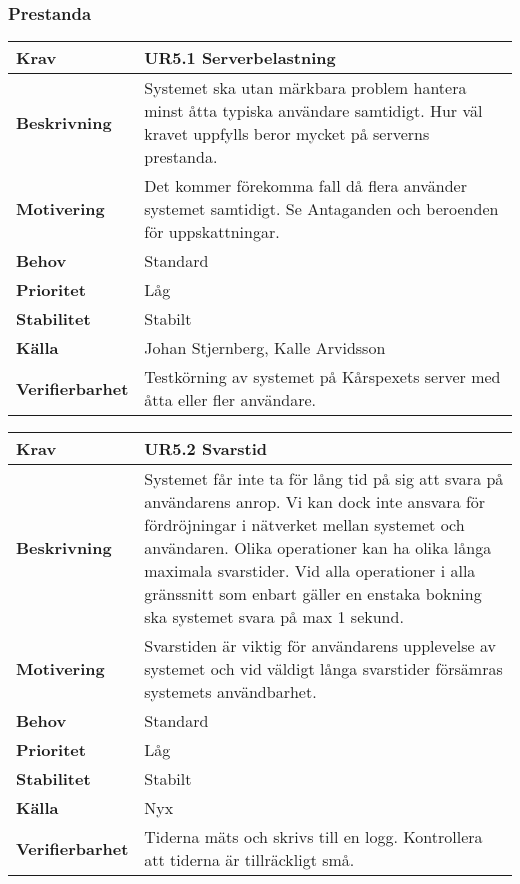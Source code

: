 \documentclass[a4paper, twoside, 11pt, titlepage]{article}
\begin{document}
		\subsubsection{Prestanda}


		\begin{tabular} { p{2.6cm} p{12.5cm} }
			\hline
			\sffamily\textbf{Krav} & \sffamily\textbf{UR5.1 Serverbelastning } \\
			\hline
			\sffamily\textbf{Beskrivning} & Systemet ska utan märkbara problem hantera minst åtta typiska användare samtidigt. Hur väl kravet uppfylls beror mycket på serverns prestanda.  \\
			\hline
			\sffamily\textbf{Motivering} & Det kommer förekomma fall då flera använder systemet samtidigt. Se Antaganden och beroenden för uppskattningar.  \\
			\hline
			\sffamily\textbf{Behov} & Standard  \\
			\hline
			\sffamily\textbf{Prioritet} & Låg  \\
			\hline
			\sffamily\textbf{Stabilitet} & Stabilt  \\
			\hline
			\sffamily\textbf{Källa} & Johan Stjernberg, Kalle Arvidsson  \\
			\hline
			\sffamily\textbf{Verifierbarhet} & Testkörning av systemet på Kårspexets server med åtta eller fler användare.  \\
			\hline
		\end{tabular}
		\vspace{6mm}

		\begin{tabular} { p{2.6cm} p{12.5cm} }
			\hline
			\sffamily\textbf{Krav} & \sffamily\textbf{UR5.2 Svarstid } \\
			\hline
			\sffamily\textbf{Beskrivning} & Systemet får inte ta för lång tid på sig att svara på användarens anrop. Vi kan dock inte ansvara för fördröjningar i nätverket mellan systemet och användaren. Olika operationer kan ha olika långa maximala svarstider. Vid alla operationer i alla gränssnitt som enbart gäller en enstaka bokning ska systemet svara på max 1 sekund.  \\
			\hline
			\sffamily\textbf{Motivering} & Svarstiden är viktig för användarens upplevelse av systemet och vid väldigt långa svarstider försämras systemets användbarhet.  \\
			\hline
			\sffamily\textbf{Behov} & Standard  \\
			\hline
			\sffamily\textbf{Prioritet} & Låg  \\
			\hline
			\sffamily\textbf{Stabilitet} & Stabilt  \\
			\hline
			\sffamily\textbf{Källa} & Nyx  \\
			\hline
			\sffamily\textbf{Verifierbarhet} & Tiderna mäts och skrivs till en logg. Kontrollera att tiderna är tillräckligt små.  \\
			\hline
		\end{tabular}
\end{document}
